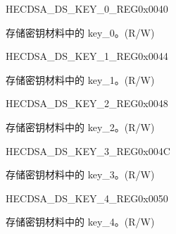 \begin{register}{H}{ECDSA\_DS\_KEY\_0\_REG}{0x0040}\label{regdesc:ECDSADSKEY0REG}
%
\regnewline%
\begin{regdesc}\begin{reglist}
\label{fielddesc:ECDSADSKEY0}\item [ECDSA\_DS\_KEY\_0] 存储密钥材料中的 key\_0。(R/W)
\end{reglist}\end{regdesc}
\end{register}


\begin{register}{H}{ECDSA\_DS\_KEY\_1\_REG}{0x0044}\label{regdesc:ECDSADSKEY1REG}
%
\regnewline%
\begin{regdesc}\begin{reglist}
\label{fielddesc:ECDSADSKEY1}\item [ECDSA\_DS\_KEY\_1] 存储密钥材料中的 key\_1。(R/W)
\end{reglist}\end{regdesc}
\end{register}


\begin{register}{H}{ECDSA\_DS\_KEY\_2\_REG}{0x0048}\label{regdesc:ECDSADSKEY2REG}
%
\regnewline%
\begin{regdesc}\begin{reglist}
\label{fielddesc:ECDSADSKEY2}\item [ECDSA\_DS\_KEY\_2] 存储密钥材料中的 key\_2。(R/W)
\end{reglist}\end{regdesc}
\end{register}


\begin{register}{H}{ECDSA\_DS\_KEY\_3\_REG}{0x004C}\label{regdesc:ECDSADSKEY3REG}
%
\regnewline%
\begin{regdesc}\begin{reglist}
\label{fielddesc:ECDSADSKEY3}\item [ECDSA\_DS\_KEY\_3] 存储密钥材料中的 key\_3。(R/W)
\end{reglist}\end{regdesc}
\end{register}


\begin{register}{H}{ECDSA\_DS\_KEY\_4\_REG}{0x0050}\label{regdesc:ECDSADSKEY4REG}
%
\regnewline%
\begin{regdesc}\begin{reglist}
\label{fielddesc:ECDSADSKEY4}\item [ECDSA\_DS\_KEY\_4] 存储密钥材料中的 key\_4。(R/W)
\end{reglist}\end{regdesc}
\end{register}


